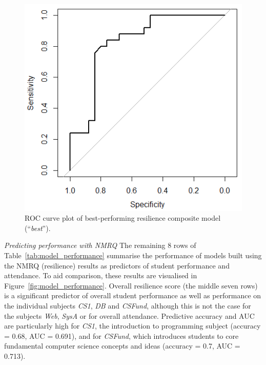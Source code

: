 \documentclass[sigconf]{acmart}
\begin{document}
\begin{figure} [h]
\centering
\includegraphics[width=.9\linewidth]{images/ROC_best_model.png}
\caption{ROC curve plot of best-performing resilience composite model (``{\em best}'').}
\label{fig:roc_curve} 
\end{figure}

{\em Predicting performance with NMRQ}
The remaining 8 rows of Table~\ref{tab:model_performance} summarise the performance of models built using the NMRQ (resilience) results as predictors of student performance and attendance. To aid comparison, these results are visualised in Figure~\ref{fig:model_performance}. Overall resilience score (the middle seven rows) is a significant predictor of overall student performance as well as performance on the individual subjects {\em CS1}, {\em DB} and {\em CSFund}, although this is not the case for the subjects {\em Web}, {\em SysA} or for overall attendance. Predictive accuracy and AUC are particularly high for {\em CS1}, the introduction to programming subject (accuracy = 0.68, AUC = 0.691), and for {\em CSFund}, which introduces students to core fundamental computer science concepts and ideas (accuracy = 0.7, AUC = 0.713).
\end{document}
